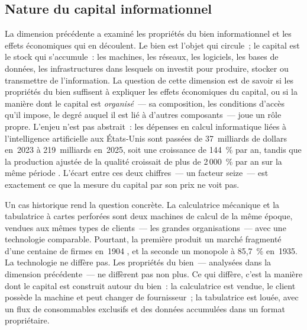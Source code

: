 
\subsection{Nature du capital informationnel}\label{sec:d2-capital}

La dimension précédente a examiné les propriétés du bien informationnel et les effets économiques qui en découlent. Le bien est l'objet qui circule~; le capital est le stock qui s'accumule~: les machines, les réseaux, les logiciels, les bases de données, les infrastructures dans lesquels on investit pour produire, stocker ou transmettre de l'information. La question de cette dimension est de savoir si les propriétés du bien suffisent à expliquer les effets économiques du capital, ou si la manière dont le capital est \emph{organisé}~--- sa composition, les conditions d'accès qu'il impose, le degré auquel il est lié à d'autres composants~--- joue un rôle propre. L'enjeu n'est pas abstrait~: les dépenses en calcul informatique liées à l'intelligence artificielle aux États-Unis sont passées de 37~milliards de dollars en~2023 à 219~milliards en~2025, soit une croissance de 144~\% par an, tandis que la production ajustée de la qualité croissait de plus de 2\,000~\% par an sur la même période \parencite{korinek_mckelvey_2026}. L'écart entre ces deux chiffres~--- un facteur seize~--- est exactement ce que la mesure du capital par son prix ne voit pas.

Un cas historique rend la question concrète. La calculatrice mécanique et la tabulatrice à cartes perforées sont deux machines de calcul de la même époque, vendues aux mêmes types de clients~--- les grandes organisations~--- avec une technologie comparable. Pourtant, la première produit un marché fragmenté d'une centaine de firmes en~1904 \parencite{cortada_before_1993}, et la seconde un monopole à 85,7~\% en~1935. La technologie ne diffère pas. Les propriétés du bien~--- analysées dans la dimension précédente~--- ne diffèrent pas non plus. Ce qui diffère, c'est la manière dont le capital est construit autour du bien~: la calculatrice est vendue, le client possède la machine et peut changer de fournisseur~; la tabulatrice est louée, avec un flux de consommables exclusifs et des données accumulées dans un format propriétaire.


